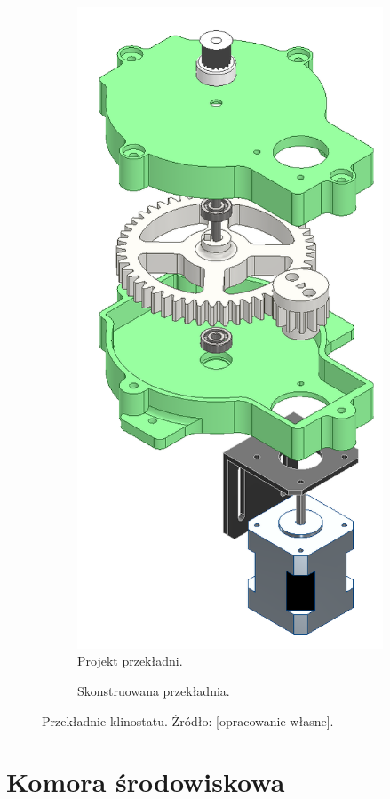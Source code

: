 \begin{figure}
	\centering
	
	\begin{subfigure}[h]{.49\textwidth}
		\centering
		\includegraphics[width=.4\textwidth]{przekladnia_projekt_exploded_shaded}
		\caption{Projekt przekładni.} 
		\label{fig:projekt przekładni}
	\end{subfigure}
	\hfill%
	\begin{subfigure}[h]{.49\textwidth}
		\centering
		\setlength{\fboxsep}{0pt}
		\setlength{\fboxrule}{1pt}
		\caption{Skonstruowana przekładnia.} 
		\label{fig:gotowa przekładnia}
	\end{subfigure}

	\caption{Przekładnie klinostatu. Źródło: [opracowanie własne].}
	
\end{figure}

\section{Komora środowiskowa}

